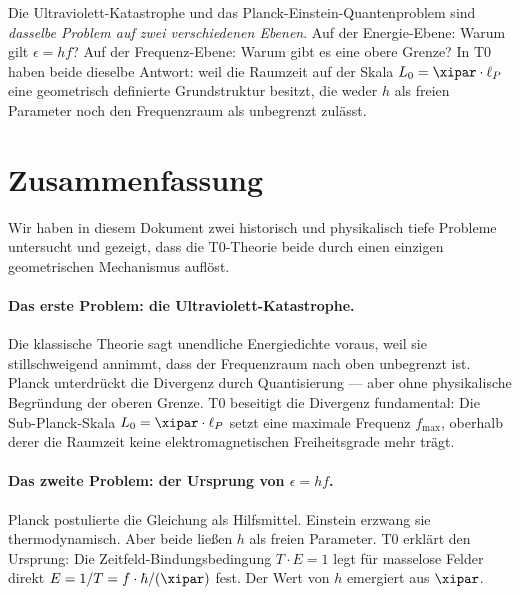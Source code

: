 \begin{revolutionary}
    Die Ultraviolett-Katastrophe und das Planck-Einstein-Quantenproblem sind 
    \emph{dasselbe Problem auf zwei verschiedenen Ebenen}. Auf der Energie-Ebene: 
    Warum gilt $\epsilon = hf$? Auf der Frequenz-Ebene: Warum gibt es eine obere 
    Grenze? In T0 haben beide dieselbe Antwort: weil die Raumzeit auf der Skala 
    $L_0 = \xipar \cdot \ell_P$ eine geometrisch definierte Grundstruktur besitzt, 
    die weder $h$ als freien Parameter noch den Frequenzraum als unbegrenzt zulässt.
\end{revolutionary}

\clearpage

\section{Zusammenfassung}
\label{sec:summary}

Wir haben in diesem Dokument zwei historisch und physikalisch tiefe Probleme untersucht 
und gezeigt, dass die T0-Theorie beide durch einen einzigen geometrischen Mechanismus 
auflöst.

\paragraph{Das erste Problem: die Ultraviolett-Katastrophe.}
Die klassische Theorie sagt unendliche Energiedichte voraus, weil sie stillschweigend 
annimmt, dass der Frequenzraum nach oben unbegrenzt ist. Planck unterdrückt die 
Divergenz durch Quantisierung — aber ohne physikalische Begründung der oberen 
Grenze. T0 beseitigt die Divergenz fundamental: Die Sub-Planck-Skala 
$L_0 = \xipar \cdot \ell_P$ setzt eine maximale Frequenz $f_{\max}$, oberhalb derer 
die Raumzeit keine elektromagnetischen Freiheitsgrade mehr trägt.

\paragraph{Das zweite Problem: der Ursprung von $\epsilon = hf$.}
Planck postulierte die Gleichung als Hilfsmittel. Einstein erzwang sie thermodynamisch. 
Aber beide ließen $h$ als freien Parameter. T0 erklärt den Ursprung: Die 
Zeitfeld-Bindungsbedingung $T \cdot E = 1$ legt für masselose Felder direkt 
$E = 1/T = f \cdot \hbar / (\xipar)$ fest. Der Wert von $h$ emergiert aus $\xipar$.

